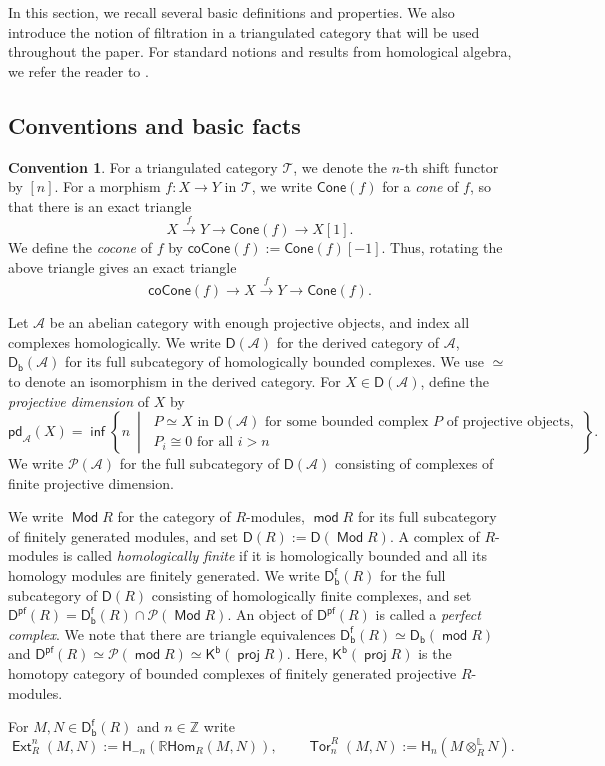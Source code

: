 \documentclass[10pt, a4paper,reqno]{amsart}
\theoremstyle{definition}
\newtheorem{conv}[conv]{Convention}
\theoremstyle{remark}
\numberwithin{equation}{thm}
\def\ZZ{\mathbb{Z}}
\def\cA{\mathcal{A}}
\def\cP{\mathcal{P}}
\def\cT{\mathcal{T}}
\def\sH{\mathsf{H}}
\def\Ext{\operatorname{\mathsf{Ext}}}
\def\mod{\operatorname{\mathsf{mod}}}
\def\Mod{\operatorname{\mathsf{Mod}}}
\def\Tor{\operatorname{\mathsf{Tor}}}
\def\D{\mathsf{D}}
\def\Db{\mathsf{D_b}}
\def\Dm{\mathsf{D}_-}
\def\Dfb{\mathsf{D^f_b}}
\def\Pf{\mathsf{D^{pf}}}
\def\proj{\operatorname{\mathsf{proj}}}
\def\ltensor{\otimes^{\mathbb{L}}}
\def\rHom{\mathbb{R}\mathsf{Hom}}
\def\inf{\operatorname{\mathsf{inf}}}
\def\Cone{\mathsf{Cone}}
\def\coCone{\mathsf{coCone}}
\def\pd{\mathsf{pd}}
\begin{document}
In this section, we recall several basic definitions and properties.
We also introduce the notion of filtration in a triangulated category that will be used throughout the paper.
For standard notions and results from homological algebra, we refer the reader to \cite{CFH,Wei}.

\subsection{Conventions and basic facts}

\begin{conv}\label{conv:general}
For a triangulated category $\cT$, we denote the $n$-th shift functor by $[n]$.
For a morphism $f\colon X\to Y$ in $\cT$, we write $\Cone(f)$ for a {\em cone} of $f$, so that there is an exact triangle
\[
X \xrightarrow{f} Y \to \Cone(f) \to X[1].
\]
We define the {\em cocone} of $f$ by $\coCone(f):=\Cone(f)[-1]$.
Thus, rotating the above triangle gives an exact triangle
\[
\coCone(f) \to X \xrightarrow{f} Y \to \Cone(f).
\]

Let $\cA$ be an abelian category with enough projective objects, and index all complexes homologically.
We write $\D(\cA)$ for the derived category of $\cA$, $\Db(\cA)$ for its full subcategory of homologically bounded complexes.
We use $\simeq$ to denote an isomorphism in the derived category.
For $X\in\D(\cA)$, define the {\em projective dimension} of $X$ by 
\[
\pd_\cA(X)
=
\inf\left\{
n \ \middle|\
\begin{array}{l}
P\simeq X \text{ in }\D(\cA)
\text{ for some bounded complex }P\text{ of projective objects},\\
P_i\cong 0 \text{ for all } i>n
\end{array}
\right\}.
\]
We write $\cP(\cA)$ for the full subcategory of $\D(\cA)$ consisting of complexes of finite projective dimension.

We write $\Mod R$ for the category of $R$-modules, $\mod R$ for its full subcategory of finitely generated modules, and set $\D(R) := \D(\Mod R)$.
A complex of $R$-modules is called {\em homologically finite} if it is homologically bounded and all its homology modules are finitely generated.
We write $\Dfb(R)$ for the full subcategory of $\D(R)$ consisting of homologically finite complexes, and set $\Pf(R) = \Dfb(R) \cap \cP(\Mod R)$.
An object of $\Pf(R)$ is called a {\em perfect complex}.
We note that there are triangle equivalences $\Dfb(R) \simeq \Db(\mod R)$ and $\Pf(R) \simeq \cP(\mod R) \simeq \mathsf{K^b}(\proj R)$.
Here, $\mathsf{K^b}(\proj R)$ is the homotopy category of bounded complexes of finitely generated projective $R$-modules.

For $M,N\in\Dfb(R)$ and $n \in \ZZ$ write 
\[
\Ext_R^n(M,N) := \sH_{-n}(\rHom_R(M,N)),\qquad
\Tor_n^R(M,N) :=\sH_n(M\ltensor_R N).
\]
\end{conv}
\end{document}
